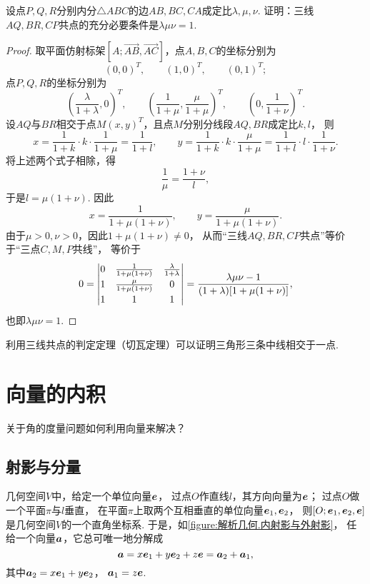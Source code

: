 \begin{example}[切瓦定理]
设点\(P,Q,R\)分别内分\(\triangle ABC\)的边\(AB,BC,CA\)成定比\(\lambda,\mu,\nu\).
证明：三线\(AQ,BR,CP\)共点的充分必要条件是\(\lambda \mu \nu = 1\).
\begin{proof}
取平面仿射标架\([A;\vec{AB},\vec{AC}]\)，点\(A,B,C\)的坐标分别为\[
	(0,0)^T, \qquad
	(1,0)^T, \qquad
	(0,1)^T;
\]
点\(P,Q,R\)的坐标分别为\[
	\left(\frac{\lambda}{1+\lambda},0\right)^T, \qquad
	\left(\frac{1}{1+\mu},\frac{\mu}{1+\mu}\right)^T, \qquad
	\left(0,\frac{1}{1+\nu}\right)^T.
\]
设\(AQ\)与\(BR\)相交于点\(M(x,y)^T\)，且点\(M\)分别分线段\(AQ,BR\)成定比\(k,l\)，
则\[
x = \frac{1}{1+k} \cdot k \cdot \frac{1}{1+\mu}
= \frac{1}{1+l}, \qquad
y = \frac{1}{1+k} \cdot k \cdot \frac{\mu}{1+\mu}
= \frac{1}{1+l} \cdot l \cdot \frac{1}{1+\nu}.
\]
将上述两个式子相除，得\[
\frac{1}{\mu}
= \frac{1+\nu}{l},
\]于是\(l = \mu(1+\nu)\).
因此\[
	x = \frac{1}{1+\mu(1+\nu)}, \qquad
	y = \frac{\mu}{1+\mu(1+\nu)}.
\]
由于\(\mu>0,\nu>0\)，因此\(1+\mu(1+\nu)\neq0\)，
从而“三线\(AQ,BR,CP\)共点”等价于“三点\(C,M,P\)共线”，
等价于\[
	0 = \def\arraystretch{1.2} \begin{vmatrix}
		0 & \frac{1}{1+\mu(1+\nu)} & \frac{\lambda}{1+\lambda} \\
		1 & \frac{\mu}{1+\mu(1+\nu)} & 0 \\
		1 & 1 & 1
	\end{vmatrix}
	= \frac{\lambda \mu \nu - 1}{(1+\lambda) [1+\mu(1+\nu)]},
\]
也即\(\lambda \mu \nu = 1\).
\end{proof}
\end{example}

利用三线共点的判定定理（切瓦定理）可以证明三角形三条中线相交于一点.

\section{向量的内积}
关于角的度量问题如何利用向量来解决？

\subsection{射影与分量}
几何空间\(V\)中，给定一个单位向量\(\boldsymbol{e}\)，
过点\(O\)作直线\(l\)，其方向向量为\(\boldsymbol{e}\)；
过点\(O\)做一个平面\(\pi\)与\(l\)垂直，
在平面\(\pi\)上取两个互相垂直的单位向量\(\boldsymbol{e}_1,\boldsymbol{e}_2\)，
则\([O;\boldsymbol{e}_1,\boldsymbol{e}_2,\boldsymbol{e}]\)是几何空间\(V\)的一个直角坐标系.
于是，如\cref{figure:解析几何.内射影与外射影}，
任给一个向量\(\boldsymbol{a}\)，它总可唯一地分解成\[
	\boldsymbol{a}
	= x \boldsymbol{e}_1 + y \boldsymbol{e}_2 + z \boldsymbol{e}
	= \boldsymbol{a}_2 + \boldsymbol{a}_1,
\]
其中\(\boldsymbol{a}_2 = x \boldsymbol{e}_1 + y \boldsymbol{e}_2\)，
\(\boldsymbol{a}_1 = z \boldsymbol{e}\).

